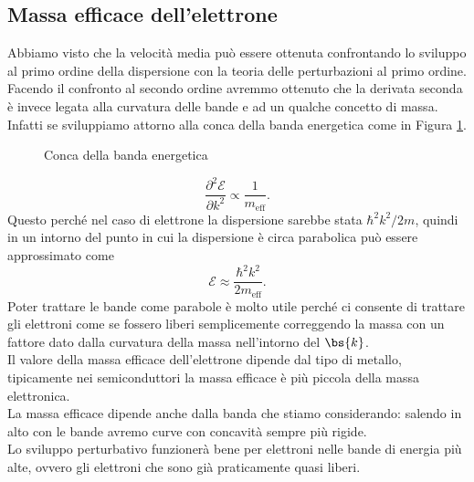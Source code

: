 \subsection{Massa efficace dell'elettrone}
\label{subsec:Massa efficace dell'elettrone}
Abbiamo visto che la velocità media può essere ottenuta confrontando lo sviluppo al primo ordine della dispersione con la teoria delle perturbazioni al primo ordine. \\
Facendo il confronto al secondo ordine avremmo ottenuto che la derivata seconda è invece legata alla curvatura delle bande e ad un qualche concetto di massa.\\
Infatti se sviluppiamo attorno alla conca della banda energetica come in Figura \ref{fig:conca-della-banda-energetica}.
\begin{figure}[H]
    \centering
    \caption{Conca della banda energetica}
    \label{fig:conca-della-banda-energetica}
\end{figure}
\[
	\frac{\partial ^2\mathcal{E}}{\partial k^2} \propto \frac{1}{m_\text{eff} }
.\] 
Questo perché nel caso di elettrone la dispersione sarebbe stata $\hbar ^2k^2/2m$, quindi in un intorno del punto in cui la dispersione è circa parabolica può essere approssimato come 
\[
	\mathcal{E}  \approx \frac{\hbar ^2 k^2}{2m_\text{eff} }
.\] 
Poter trattare le bande come parabole è molto utile perché ci consente di trattare gli elettroni come se fossero liberi semplicemente correggendo la massa con un fattore dato dalla curvatura della massa nell'intorno del $\bs{k}$.\\
Il valore della massa efficace dell'elettrone dipende dal tipo di metallo, tipicamente nei semiconduttori la massa efficace è più piccola della massa elettronica.\\
La massa efficace dipende anche dalla banda che stiamo considerando: salendo in alto con le bande avremo curve con concavità sempre più rigide.\\
Lo sviluppo perturbativo funzionerà bene per elettroni nelle bande di energia più alte, ovvero gli elettroni che sono già praticamente quasi liberi.
